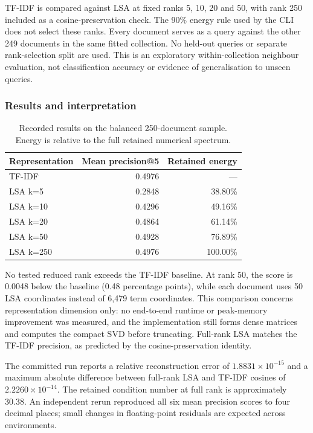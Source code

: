 \documentclass[12pt,a4paper]{report}
\theoremstyle{plain}
\theoremstyle{definition}
\theoremstyle{remark}
\theoremstyle{definition}
\begin{document}
TF-IDF is compared against LSA at fixed ranks 5, 10, 20 and 50, with rank 250 included as a cosine-preservation check. The 90\% energy rule used by the CLI does not select these ranks. Every document serves as a query against the other 249 documents in the same fitted collection. No held-out queries or separate rank-selection split are used. This is an exploratory within-collection neighbour evaluation, not classification accuracy or evidence of generalisation to unseen queries.

\subsubsection{Results and interpretation}
\begin{table}[H]
\centering
\caption{Recorded results on the balanced 250-document sample. Energy is relative to the full retained numerical spectrum.}
\label{tab:bigresults}
\begin{tabular}{@{}lrr@{}}
\toprule
Representation & Mean precision@5 & Retained energy\\
\midrule
TF-IDF & 0.4976 & ---\\
LSA k=5 & 0.2848 & 38.80\%\\
LSA k=10 & 0.4296 & 49.16\%\\
LSA k=20 & 0.4864 & 61.14\%\\
LSA k=50 & 0.4928 & 76.89\%\\
LSA k=250 & 0.4976 & 100.00\%\\
\bottomrule
\end{tabular}
\end{table}

No tested reduced rank exceeds the TF-IDF baseline. At rank 50, the score is 0.0048 below the baseline (0.48 percentage points), while each document uses 50 LSA coordinates instead of 6,479 term coordinates. This comparison concerns representation dimension only: no end-to-end runtime or peak-memory improvement was measured, and the implementation still forms dense matrices and computes the compact SVD before truncating. Full-rank LSA matches the TF-IDF precision, as predicted by the cosine-preservation identity.

The committed run reports a relative reconstruction error of $1.8831\times10^{-15}$ and a maximum absolute difference between full-rank LSA and TF-IDF cosines of $2.2260\times10^{-14}$. The retained condition number at full rank is approximately 30.38. An independent rerun reproduced all six mean precision scores to four decimal places; small changes in floating-point residuals are expected across environments.
\end{document}
